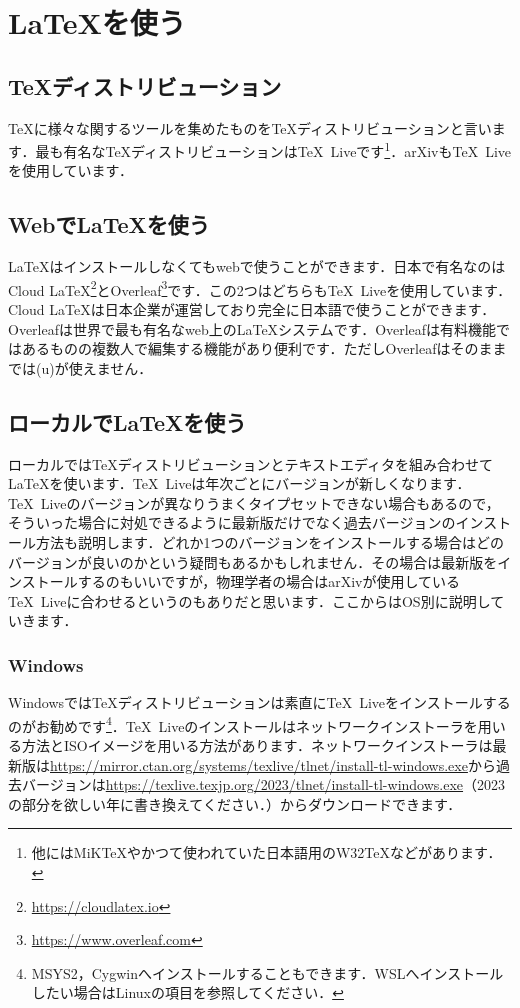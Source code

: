 \section{\LaTeX を使う}
\subsection{\TeX ディストリビューション}
\TeX に様々な関するツールを集めたものを\TeX ディストリビューションと言います．最も有名な\TeX ディストリビューションは\TeX\ Liveです\footnote{他にはMiK\TeX やかつて使われていた日本語用のW32\TeX などがあります．}．arXivも\TeX\ Liveを使用しています．

\subsection{Webで\LaTeX を使う}
\LaTeX はインストールしなくてもwebで使うことができます．日本で有名なのはCloud LaTeX\footnote{\url{https://cloudlatex.io}}とOverleaf\footnote{\url{https://www.overleaf.com}}です．この2つはどちらも\TeX\ Liveを使用しています．Cloud LaTeXは日本企業が運営しており完全に日本語で使うことができます．Overleafは世界で最も有名なweb上の\LaTeX システムです．Overleafは有料機能ではあるものの複数人で編集する機能があり便利です．ただしOverleafはそのままでは(u)\pLaTeX が使えません．

\subsection{ローカルで\LaTeX を使う}
ローカルでは\TeX ディストリビューションとテキストエディタを組み合わせて\LaTeX を使います．\TeX\ Liveは年次ごとにバージョンが新しくなります．\TeX\ Liveのバージョンが異なりうまくタイプセットできない場合もあるので，そういった場合に対処できるように最新版だけでなく過去バージョンのインストール方法も説明します．どれか1つのバージョンをインストールする場合はどのバージョンが良いのかという疑問もあるかもしれません．その場合は最新版をインストールするのもいいですが，物理学者の場合はarXivが使用している\TeX\ Liveに合わせるというのもありだと思います．ここからはOS別に説明していきます．

\subsubsection*{Windows}
Windowsでは\TeX ディストリビューションは素直に\TeX\ Liveをインストールするのがお勧めです\footnote{MSYS2，Cygwinへインストールすることもできます．WSLへインストールしたい場合はLinuxの項目を参照してください．}．\TeX\ Liveのインストールはネットワークインストーラを用いる方法とISOイメージを用いる方法があります．ネットワークインストーラは最新版は\url{https://mirror.ctan.org/systems/texlive/tlnet/install-tl-windows.exe}から過去バージョンは\url{https://texlive.texjp.org/2023/tlnet/install-tl-windows.exe}（2023の部分を欲しい年に書き換えてください．）からダウンロードできます．